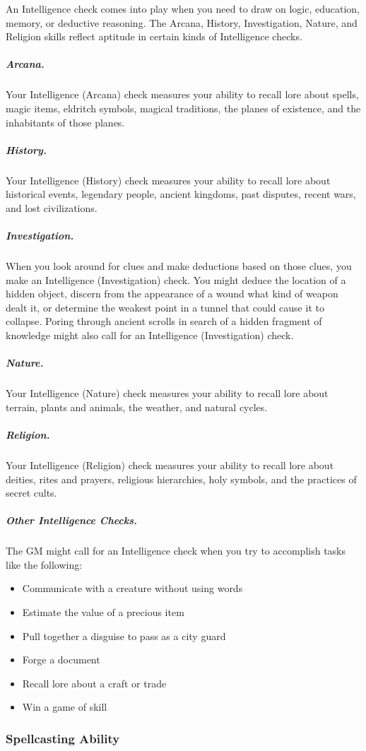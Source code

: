 An Intelligence check comes into play when you need to draw on logic, education, memory, or deductive reasoning. The Arcana, History, Investigation, Nature, and Religion skills reflect aptitude in certain kinds of Intelligence checks.

\subparagraph*{Arcana.} Your Intelligence (Arcana) check measures your ability to recall lore about spells, magic items, eldritch symbols, magical traditions, the planes of existence, and the inhabitants of those planes.

\subparagraph*{History.} Your Intelligence (History) check measures your ability to recall lore about historical events, legendary people, ancient kingdoms, past disputes, recent wars, and lost civilizations.

\subparagraph*{Investigation.} When you look around for clues and make deductions based on those clues, you make an Intelligence (Investigation) check. You might deduce the location of a hidden object, discern from the appearance of a wound what kind of weapon dealt it, or determine the weakest point in a tunnel that could cause it to collapse. Poring through ancient scrolls in search of a hidden fragment of knowledge might also call for an Intelligence (Investigation) check.

\subparagraph*{Nature.} Your Intelligence (Nature) check measures your ability to recall lore about terrain, plants and animals, the weather, and natural cycles.

\subparagraph*{Religion.} Your Intelligence (Religion) check measures your ability to recall lore about deities, rites and prayers, religious hierarchies, holy symbols, and the practices of secret cults.

\subparagraph*{Other Intelligence Checks.} The GM might call for an Intelligence check when you try to accomplish tasks like the following:

\begin{itemize}
\item Communicate with a creature without using words
\item Estimate the value of a precious item
\item Pull together a disguise to pass as a city guard
\item Forge a document
\item Recall lore about a craft or trade
\item Win a game of skill
\end{itemize}

\subsubsection{Spellcasting Ability}


